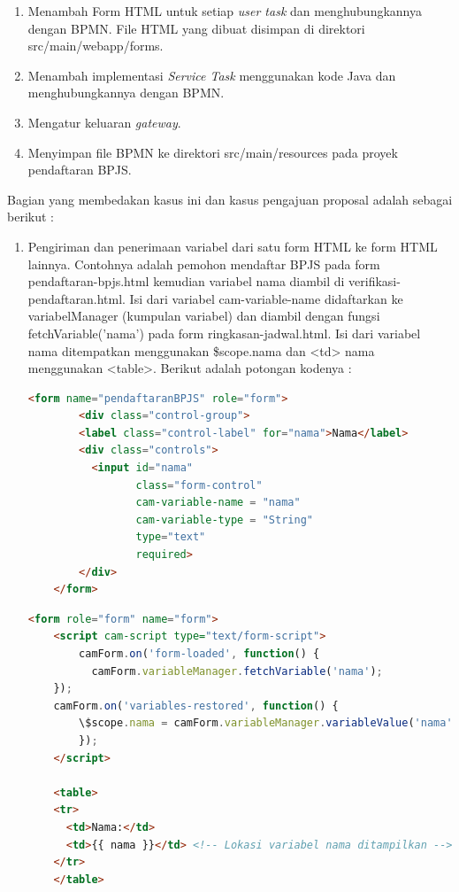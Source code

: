\begin{enumerate}
	\item Menambah Form HTML untuk setiap \textit{user task} dan menghubungkannya dengan BPMN. File HTML yang dibuat disimpan di direktori src/main/webapp/forms. 
	\item Menambah implementasi \textit{Service Task} menggunakan kode Java dan menghubungkannya dengan BPMN.
	\item Mengatur keluaran \textit{gateway}. 
	\item Menyimpan file BPMN ke direktori src/main/resources pada proyek pendaftaran BPJS.
\end{enumerate}

Bagian yang membedakan kasus ini dan kasus pengajuan proposal adalah sebagai berikut :
\begin{enumerate}
	\item Pengiriman dan penerimaan variabel dari satu form HTML ke form HTML lainnya. Contohnya adalah pemohon mendaftar BPJS pada form pendaftaran-bpjs.html kemudian variabel nama diambil di verifikasi-pendaftaran.html. Isi dari variabel cam-variable-name didaftarkan ke variabelManager (kumpulan variabel) dan diambil dengan fungsi fetchVariable('nama') pada form ringkasan-jadwal.html. Isi dari variabel nama ditempatkan menggunakan \$scope.nama dan <td>{{ nama }} menggunakan <table>.  Berikut adalah potongan kodenya :
	
	\begin{lstlisting}[language=html,basicstyle=\tiny,caption=pilih-jadwal.html]
	<form name="pendaftaranBPJS" role="form">
		<div class="control-group">
		<label class="control-label" for="nama">Nama</label>
	    <div class="controls">
	      <input id="nama"
	             class="form-control"
	             cam-variable-name = "nama"
	             cam-variable-type = "String"
	             type="text"
	             required>
	    </div>	
	</form>
	\end{lstlisting}
	
	\begin{lstlisting}[language=html,basicstyle=\tiny,caption=ringkasan-jadwal.html]
<form role="form" name="form">
	<script cam-script type="text/form-script">
    	camForm.on('form-loaded', function() {
	      camForm.variableManager.fetchVariable('nama');
	});
	camForm.on('variables-restored', function() {
		\$scope.nama = camForm.variableManager.variableValue('nama');
		});
  	</script>
		
	<table>
    <tr>
      <td>Nama:</td>
      <td>{{ nama }}</td> <!-- Lokasi variabel nama ditampilkan -->
    </tr>
	</table>
	\end{lstlisting}
	

\end{enumerate}
